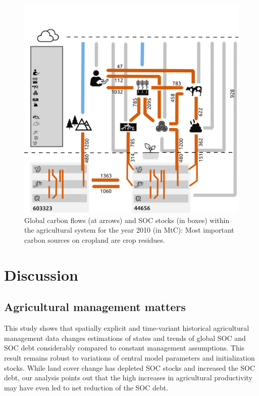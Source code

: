 \documentclass[gc, manuscript]{copernicus}
\begin{document}
\begin{figure}[h]
\includegraphics[width=16cm]{../ResultNotebooks/Output/Images/CarbonBudget} \caption{Global carbon flows (at arrows) and SOC stocks (in boxes) within the agricultural system for the year 2010 (in MtC): Most important carbon sources on cropland are crop residues.}\label{fig:FlowFig}
\end{figure}

\newpage

\hypertarget{discussion}{%
\section{Discussion}\label{discussion}}

\hypertarget{agricultural-management-matters}{%
\subsection{Agricultural management matters}\label{agricultural-management-matters}}

This study shows that spatially explicit and time-variant historical agricultural management data changes estimations of states and trends of global SOC and SOC debt considerably compared to constant management assumptions. This result remains robust to variations of central model parameters and initialization stocks. While land cover change has depleted SOC stocks and increased the SOC debt, our analysis points out that the high increases in agricultural productivity may have even led to net reduction of the SOC debt.
\end{document}
